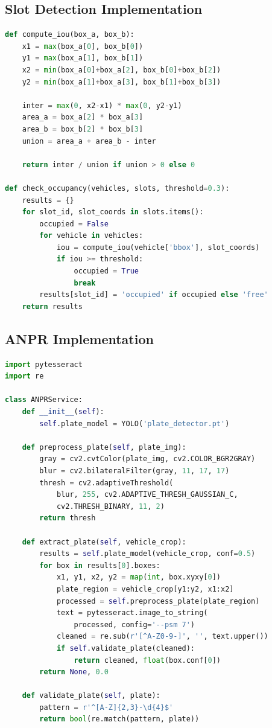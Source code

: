 \documentclass[12pt,a4paper]{report}
\begin{document}
\subsection{Slot Detection Implementation}

\begin{lstlisting}[language=Python, caption=IoU-Based Slot Detection]
def compute_iou(box_a, box_b):
    x1 = max(box_a[0], box_b[0])
    y1 = max(box_a[1], box_b[1])
    x2 = min(box_a[0]+box_a[2], box_b[0]+box_b[2])
    y2 = min(box_a[1]+box_a[3], box_b[1]+box_b[3])

    inter = max(0, x2-x1) * max(0, y2-y1)
    area_a = box_a[2] * box_a[3]
    area_b = box_b[2] * box_b[3]
    union = area_a + area_b - inter

    return inter / union if union > 0 else 0

def check_occupancy(vehicles, slots, threshold=0.3):
    results = {}
    for slot_id, slot_coords in slots.items():
        occupied = False
        for vehicle in vehicles:
            iou = compute_iou(vehicle['bbox'], slot_coords)
            if iou >= threshold:
                occupied = True
                break
        results[slot_id] = 'occupied' if occupied else 'free'
    return results
\end{lstlisting}

\subsection{ANPR Implementation}

\begin{lstlisting}[language=Python, caption=License Plate Recognition]
import pytesseract
import re

class ANPRService:
    def __init__(self):
        self.plate_model = YOLO('plate_detector.pt')

    def preprocess_plate(self, plate_img):
        gray = cv2.cvtColor(plate_img, cv2.COLOR_BGR2GRAY)
        blur = cv2.bilateralFilter(gray, 11, 17, 17)
        thresh = cv2.adaptiveThreshold(
            blur, 255, cv2.ADAPTIVE_THRESH_GAUSSIAN_C,
            cv2.THRESH_BINARY, 11, 2)
        return thresh

    def extract_plate(self, vehicle_crop):
        results = self.plate_model(vehicle_crop, conf=0.5)
        for box in results[0].boxes:
            x1, y1, x2, y2 = map(int, box.xyxy[0])
            plate_region = vehicle_crop[y1:y2, x1:x2]
            processed = self.preprocess_plate(plate_region)
            text = pytesseract.image_to_string(
                processed, config='--psm 7')
            cleaned = re.sub(r'[^A-Z0-9-]', '', text.upper())
            if self.validate_plate(cleaned):
                return cleaned, float(box.conf[0])
        return None, 0.0

    def validate_plate(self, plate):
        pattern = r'^[A-Z]{2,3}-\d{4}$'
        return bool(re.match(pattern, plate))
\end{lstlisting}
\end{document}
